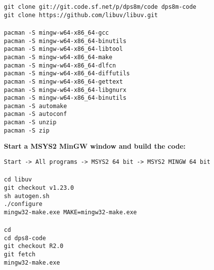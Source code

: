 \begin{adjustwidth}{5ex}{1ex}
	\texttt{git clone git://git.code.sf.net/p/dps8m/code dps8m-code} \\
    \texttt{git clone https://github.com/libuv/libuv.git} \\
    \\
    \texttt{pacman -S mingw-w64-x86\_64-gcc} \\
    \texttt{pacman -S mingw-w64-x86\_64-binutils} \\
    \texttt{pacman -S mingw-w64-x86\_64-libtool} \\
    \texttt{pacman -S mingw-w64-x86\_64-make} \\
    \texttt{pacman -S mingw-w64-x86\_64-dlfcn} \\
    \texttt{pacman -S mingw-w64-x86\_64-diffutils} \\
    \texttt{pacman -S mingw-w64-x86\_64-gettext} \\
    \texttt{pacman -S mingw-w64-x86\_64-libgnurx} \\
    \texttt{pacman -S mingw-w64-x86\_64-binutils} \\
    \texttt{pacman -S automake} \\
    \texttt{pacman -S autoconf} \\
    \texttt{pacman -S unzip} \\
    \texttt{pacman -S zip} \\
\end{adjustwidth}

\textbf{Start a MSYS2 MinGW window and build the code:}

\begin{adjustwidth}{5ex}{1ex}
    \texttt{Start -> All programs -> MSYS2 64 bit -> MSYS2 MINGW 64 bit} \\
\\
    \texttt{cd libuv} \\
    \texttt{git checkout v1.23.0} \\
    \texttt{sh autogen.sh} \\
    \texttt{./configure} \\
    \texttt{mingw32-make.exe MAKE=mingw32-make.exe} \\
\\
    \texttt{cd} \\
    \texttt{cd dps8-code} \\
    \texttt{git checkout R2.0} \\
    \texttt{git fetch} \\
    \texttt{mingw32-make.exe} \\
\end{adjustwidth}

